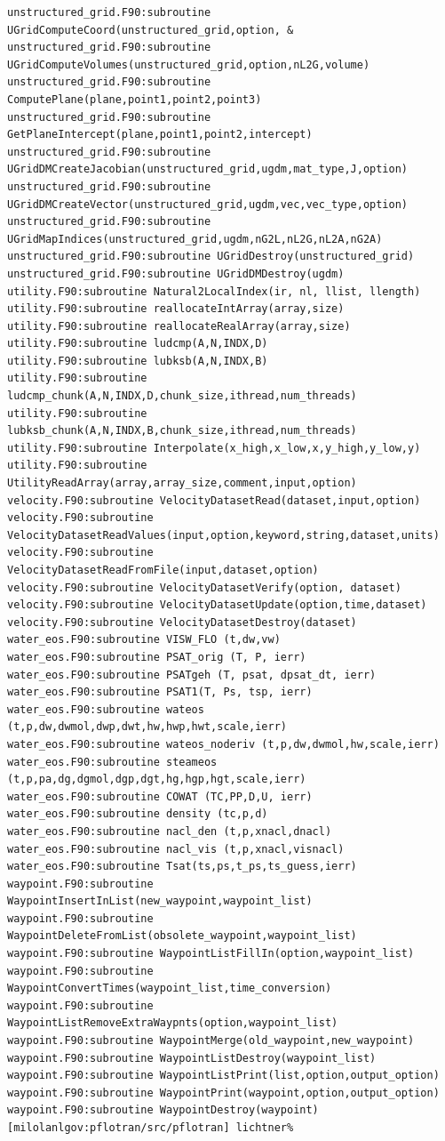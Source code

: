 \documentclass[12pt]{article}
\begin{document}
\begin{verbatim}
unstructured_grid.F90:subroutine UGridComputeCoord(unstructured_grid,option, &
unstructured_grid.F90:subroutine UGridComputeVolumes(unstructured_grid,option,nL2G,volume)
unstructured_grid.F90:subroutine ComputePlane(plane,point1,point2,point3)
unstructured_grid.F90:subroutine GetPlaneIntercept(plane,point1,point2,intercept)
unstructured_grid.F90:subroutine UGridDMCreateJacobian(unstructured_grid,ugdm,mat_type,J,option)
unstructured_grid.F90:subroutine UGridDMCreateVector(unstructured_grid,ugdm,vec,vec_type,option)
unstructured_grid.F90:subroutine UGridMapIndices(unstructured_grid,ugdm,nG2L,nL2G,nL2A,nG2A)
unstructured_grid.F90:subroutine UGridDestroy(unstructured_grid)
unstructured_grid.F90:subroutine UGridDMDestroy(ugdm)
utility.F90:subroutine Natural2LocalIndex(ir, nl, llist, llength)
utility.F90:subroutine reallocateIntArray(array,size)
utility.F90:subroutine reallocateRealArray(array,size)
utility.F90:subroutine ludcmp(A,N,INDX,D)
utility.F90:subroutine lubksb(A,N,INDX,B)
utility.F90:subroutine ludcmp_chunk(A,N,INDX,D,chunk_size,ithread,num_threads)
utility.F90:subroutine lubksb_chunk(A,N,INDX,B,chunk_size,ithread,num_threads)
utility.F90:subroutine Interpolate(x_high,x_low,x,y_high,y_low,y)
utility.F90:subroutine UtilityReadArray(array,array_size,comment,input,option)
velocity.F90:subroutine VelocityDatasetRead(dataset,input,option)
velocity.F90:subroutine VelocityDatasetReadValues(input,option,keyword,string,dataset,units)
velocity.F90:subroutine VelocityDatasetReadFromFile(input,dataset,option)
velocity.F90:subroutine VelocityDatasetVerify(option, dataset)
velocity.F90:subroutine VelocityDatasetUpdate(option,time,dataset)
velocity.F90:subroutine VelocityDatasetDestroy(dataset)
water_eos.F90:subroutine VISW_FLO (t,dw,vw)
water_eos.F90:subroutine PSAT_orig (T, P, ierr)
water_eos.F90:subroutine PSATgeh (T, psat, dpsat_dt, ierr)
water_eos.F90:subroutine PSAT1(T, Ps, tsp, ierr)
water_eos.F90:subroutine wateos (t,p,dw,dwmol,dwp,dwt,hw,hwp,hwt,scale,ierr)
water_eos.F90:subroutine wateos_noderiv (t,p,dw,dwmol,hw,scale,ierr)
water_eos.F90:subroutine steameos (t,p,pa,dg,dgmol,dgp,dgt,hg,hgp,hgt,scale,ierr)
water_eos.F90:subroutine COWAT (TC,PP,D,U, ierr)
water_eos.F90:subroutine density (tc,p,d)
water_eos.F90:subroutine nacl_den (t,p,xnacl,dnacl)
water_eos.F90:subroutine nacl_vis (t,p,xnacl,visnacl)
water_eos.F90:subroutine Tsat(ts,ps,t_ps,ts_guess,ierr)
waypoint.F90:subroutine WaypointInsertInList(new_waypoint,waypoint_list)
waypoint.F90:subroutine WaypointDeleteFromList(obsolete_waypoint,waypoint_list)
waypoint.F90:subroutine WaypointListFillIn(option,waypoint_list)
waypoint.F90:subroutine WaypointConvertTimes(waypoint_list,time_conversion)
waypoint.F90:subroutine WaypointListRemoveExtraWaypnts(option,waypoint_list)
waypoint.F90:subroutine WaypointMerge(old_waypoint,new_waypoint)
waypoint.F90:subroutine WaypointListDestroy(waypoint_list)
waypoint.F90:subroutine WaypointListPrint(list,option,output_option)
waypoint.F90:subroutine WaypointPrint(waypoint,option,output_option)
waypoint.F90:subroutine WaypointDestroy(waypoint)
[milolanlgov:pflotran/src/pflotran] lichtner% 
\end{verbatim} 
\end{document}

